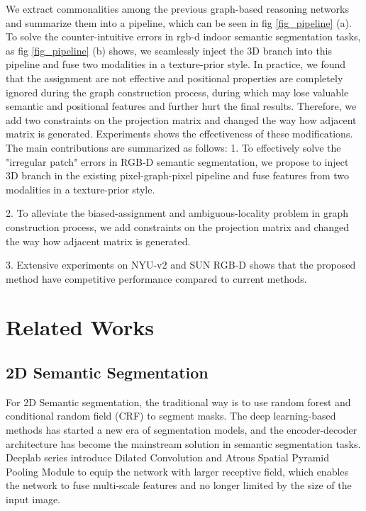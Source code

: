 ﻿\documentclass[journal]{IEEEtran}
\begin{document}
 
    We extract commonalities among the previous graph-based reasoning networks and summarize them into a pipeline, which can be seen in fig \ref{fig_pipeline} (a). To solve the counter-intuitive errors in rgb-d indoor semantic segmentation tasks, as fig \ref{fig_pipeline} (b) shows, we seamlessly inject the 3D branch into this pipeline and fuse two modalities in a texture-prior style. In practice, we found that the assignment are not effective and positional properties are completely ignored during the graph construction process, during which may lose valuable semantic and positional features and further hurt the final results. Therefore, we add two constraints on the projection matrix and changed the way how adjacent matrix is generated. Experiments shows the effectiveness of these modifications. 
    The main contributions are summarized as follows: 
    1. To effectively solve the "irregular patch" errors in RGB-D semantic segmentation, we propose to inject 3D branch in the existing pixel-graph-pixel pipeline and fuse features from two modalities in a texture-prior style.
    
    2. To alleviate the biased-assignment and ambiguous-locality problem in graph construction process, we add constraints on the projection matrix and changed the way how adjacent matrix is generated.

    3. Extensive experiments on NYU-v2 and SUN RGB-D shows that the proposed method have competitive performance compared to current methods.\\   

\section{Related Works} \label{sec_related}

\subsection{2D Semantic Segmentation}

 
    For 2D Semantic segmentation, the traditional way is to use random forest and conditional random field (CRF) to segment masks. The deep learning-based methods \cite{long2015fully} has started a new era of segmentation models, and the encoder-decoder architecture has become the mainstream solution in semantic segmentation tasks\cite{unet}. Deeplab series\cite{chen2017deeplab}\cite{cheng2020panoptic} introduce Dilated Convolution and Atrous Spatial Pyramid Pooling Module to equip the network with larger receptive field, which enables the network to fuse multi-scale features and no longer limited by the size of the input image. \\   
    
\end{document}
